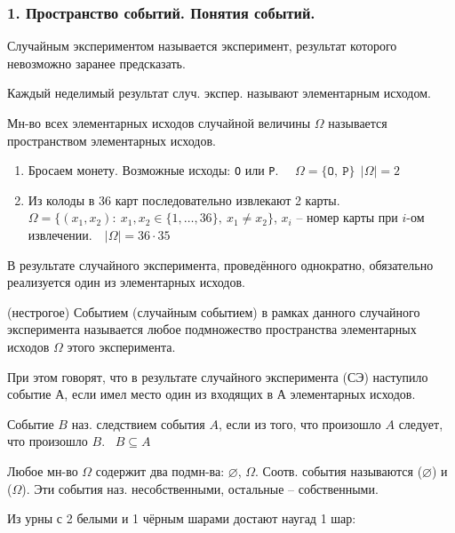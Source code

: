 
\subsubsection*{1. Пространство событий. Понятия событий.}
\OPR Случайным экспериментом называется эксперимент, результат которого невозможно заранее предсказать.

\OPR Каждый неделимый результат случ. экспер. называют элементарным исходом.

\OPR Мн-во всех элементарных исходов случайной величины $\Omega$ называется пространством элементарных исходов.

\PRIM
\begin{enumerate}[topsep=0pt, leftmargin=18pt, noitemsep]
	\item Бросаем монету. Возможные исходы: \texttt{O} или \texttt{P}.~~ $\Omega = \{\texttt{O},~\texttt{P}\}~~|\Omega|=2$
	
	\item Из колоды в 36 карт последовательно извлекают 2 карты.~~ 
	$\Omega=\{(x_1,x_2):~x_1,x_2\in \{1,\dots,36\},~x_1\neq x_2\}$, $x_i$ -- 
	номер карты при $i$-ом извлечении.~~$|\Omega|=36\cdot 35$
\end{enumerate}

В результате случайного эксперимента, проведённого однократно, обязательно реализуется один из элементарных исходов.

\OPR (нестрогое) Событием (случайным событием) в рамках данного случайного эксперимента называется любое подмножество пространства элементарных исходов $\Omega$ этого эксперимента.

При этом говорят, что в результате случайного эксперимента (СЭ) наступило событие А, если имел место один из входящих в А элементарных исходов.

\OPR Событие $B$ наз. следствием события $A$, если из того, что произошло $A$ следует, что произошло $B$. ~$B\subseteq A$

\ZAM Любое мн-во $\Omega$ содержит два подмн-ва: $\varnothing$, $\Omega$. Соотв. события называются  ($\varnothing$) и  ($\Omega$). Эти события наз. несобственными, остальные -- собственными.

\PRIM Из урны с 2 белыми и 1 чёрным шарами достают наугад 1 шар:

